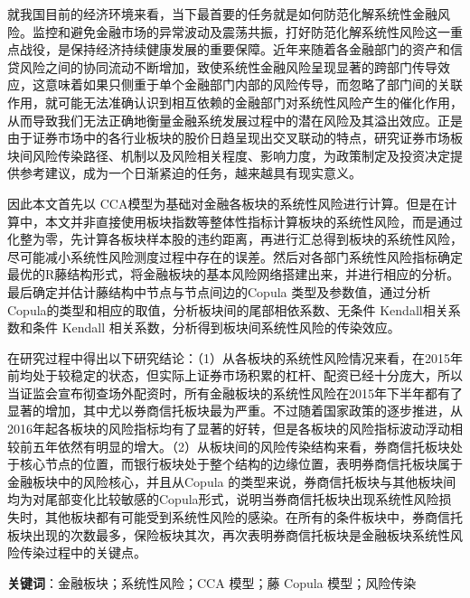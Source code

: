 \begin{cabstract}
  \renewcommand{\chapterlabel}{摘\hspace{2em}要}

  就我国目前的经济环境来看，当下最首要的任务就是如何防范化解系统性金融风险。监控和避免金融市场的异常波动及震荡共振，打好防范化解系统性风险这一重点战役，是保持经济持续健康发展的重要保障。近年来随着各金融部门的资产和信贷风险之间的协同流动不断增加，致使系统性金融风险呈现显著的跨部门传导效应，这意味着如果只侧重于单个金融部门内部的风险传导，而忽略了部门间的关联作用，就可能无法准确认识到相互依赖的金融部门对系统性风险产生的催化作用，从而导致我们无法正确地衡量金融系统发展过程中的潜在风险及其溢出效应。正是由于证券市场中的各行业板块的股价日趋呈现出交叉联动的特点，研究证券市场板块间风险传染路径、机制以及风险相关程度、影响力度，为政策制定及投资决定提供参考建议，成为一个日渐紧迫的任务，越来越具有现实意义。

  因此本文首先以 CCA模型为基础对金融各板块的系统性风险进行计算。但是在计算中，本文并非直接使用板块指数等整体性指标计算板块的系统性风险，而是通过化整为零，先计算各板块样本股的违约距离，再进行汇总得到板块的系统性风险，尽可能减小系统性风险测度过程中存在的误差。然后对各部门系统性风险指标确定最优的R藤结构形式，将金融板块的基本风险网络搭建出来，并进行相应的分析。最后确定并估计藤结构中节点与节点间边的Copula 类型及参数值，通过分析Copula的类型和相应的取值，分析板块间的尾部相依系数、无条件 Kendall相关系数和条件 Kendall 相关系数，分析得到板块间系统性风险的传染效应。
  
  在研究过程中得出以下研究结论：（1）从各板块的系统性风险情况来看，在2015年前均处于较稳定的状态，但实际上证券市场积累的杠杆、配资已经十分庞大，所以当证监会宣布彻查场外配资时，所有金融板块的系统性风险在2015年下半年都有了显著的增加，其中尤以券商信托板块最为严重。不过随着国家政策的逐步推进，从2016年起各板块的风险指标均有了显著的好转，但是各板块的风险指标波动浮动相较前五年依然有明显的增大。（2）从板块间的风险传染结构来看，券商信托板块处于核心节点的位置，而银行板块处于整个结构的边缘位置，表明券商信托板块属于金融板块中的风险核心，并且从Copula 的类型来说，券商信托板块与其他板块间均为对尾部变化比较敏感的Copula形式，说明当券商信托板块出现系统性风险损失时，其他板块都有可能受到系统性风险的感染。在所有的条件板块中，券商信托板块出现的次数最多，保险板块其次，再次表明券商信托板块是金融板块系统性风险传染过程中的关键点。
 
  
  \bigbreak

  {\bfseries 关键词}：金融板块；系统性风险；CCA 模型；藤 Copula 模型；风险传染
   
\blankpage
\end{cabstract}




